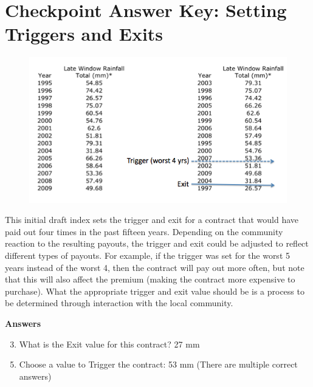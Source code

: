 \documentclass[letterpaper,10pt,english]{sphinxmanual}
\begin{document}
\section{Checkpoint Answer Key: Setting Triggers and Exits}
\label{whatisindexinsurance/conceptsbehindindexdesignanskey_en::doc}\label{whatisindexinsurance/conceptsbehindindexdesignanskey_en:checkpoint-answer-key-setting-triggers-and-exits}\begin{figure}[htbp]
\centering

\includegraphics{chpt4imacheckans.png}
\end{figure}

This initial draft index sets the trigger and exit for a contract that would have paid out four times in the past fifteen years. Depending on the community reaction to the resulting payouts, the trigger and exit could be adjusted to reflect different types of payouts.  For example, if the trigger was set for the worst 5 years instead of the worst 4, then the contract will pay out more often, but note that this will also affect the premium (making the contract more expensive to purchase).  What the appropriate trigger and exit value should be is a process to be determined through interaction with the local community.

\textbf{Answers}
\begin{enumerate}
\setcounter{enumi}{2}
\item {} 
What is the Exit value for this contract? 27 mm

\end{enumerate}
\begin{enumerate}
\setcounter{enumi}{4}
\item {} 
Choose a value to Trigger the contract: 53 mm (There are multiple correct answers)

\end{enumerate}
\end{document}
